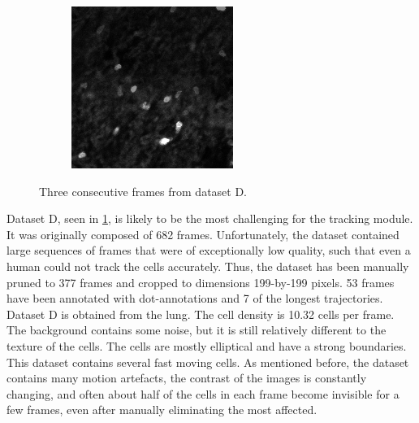 \begin{figure}[h]
\begin{subfigure}{.32\textwidth}
		\end{subfigure}
		\hfill
		\begin{subfigure}{.32\textwidth}
		\includegraphics[width=\textwidth]{images/series14croppedclean027}
		\end{subfigure}
		\caption{Three consecutive frames from dataset D.}
		\label{fig:data_datasetD}
	\end{figure}

 	Dataset D, seen in \cref{fig:data_datasetD}, is likely to be the most challenging for the tracking module. It was originally composed of 682 frames. Unfortunately, the dataset contained large sequences of frames that were of exceptionally low quality, such that even a human could not track the cells accurately. Thus, the dataset has been manually pruned to 377 frames and cropped to dimensions 199-by-199 pixels. 53 frames have been annotated with dot-annotations and 7 of the longest trajectories. Dataset D is obtained from the lung. The cell density is 10.32 cells per frame. The background contains some noise, but it is still relatively different to the texture of the cells. The cells are mostly elliptical and have a strong boundaries. This dataset contains several fast moving cells. As mentioned before, the dataset contains many motion artefacts, the contrast of the images is constantly changing, and often about half of the cells in each frame become invisible for a few frames, even after manually eliminating the most affected.
	
